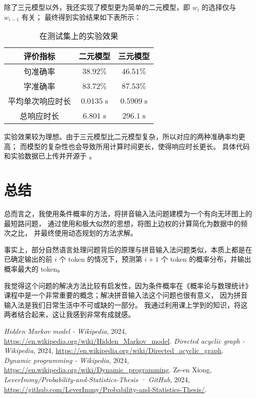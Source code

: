 \documentclass[UTF8]{ctexart}
\begin{document}
除了三元模型以外，我还实现了模型更为简单的二元模型，即 $w_i$ 的选择仅与 $w_{i-1}$ 有关；
最终得到实验结果如下表所示：
\begin{table}[H]
    \centering
    \begin{tabular}{||c||c|c||}
        \hline
        评价指标 & 二元模型 & 三元模型 \\
        \hline
        句准确率 & $38.92\%$ & $46.51\%$ \\
        字准确率 & $83.72\%$ & $87.53\%$ \\
        平均单次响应时长 & $0.0135\;\mathrm{s}$ & $0.5909\;\mathrm{s}$ \\
        总响应时长 & $6.801\;\mathrm{s}$ & $296.1\;\mathrm{s}$ \\
        \hline
    \end{tabular}
    \caption{在测试集上的实验效果}
\end{table}
实验效果较为理想。由于三元模型比二元模型复杂，所以对应的两种准确率均更高；
而模型的复杂性也会导致所用计算时间更长，使得响应时长更长。
具体代码和实验数据已上传并开源于 \cite{Pinyin}。

\section{总结}

总而言之，我使用条件概率的方法，将拼音输入法问题建模为一个有向无环图上的最短路问题，
通过使用和极大似然的思想，将图上边权的计算简化为数据中的频次之比，
并最终使用动态规划的方法求解。

事实上，部分自然语言处理问题背后的原理与拼音输入法问题类似，本质上都是在已确定输出的前 $i$ 个 token
的情况下，预测第 $i+1$ 个 token 的概率分布，并输出概率最大的 token。

我觉得这个问题的解决方法比较有启发性，因为条件概率在《概率论与数理统计》
课程中是一个非常重要的概念；解决拼音输入法这个问题也很有意义，
因为拼音输入法是我们日常生活中不可或缺的一部分。
我通过利用课上学到的知识，将这两者结合起来，这让我感到非常有成就感。

\begin{thebibliography}{9}
    \emph{Hidden Markov model - Wikipedia},
    2024,
    \url{https://en.wikipedia.org/wiki/Hidden_Markov_model}.
    \emph{Directed acyclic graph - Wikipedia},
    2024,
    \url{https://en.wikipedia.org/wiki/Directed_acyclic_graph}.
    \emph{Dynamic programming - Wikipedia},
    2024,
    \url{https://en.wikipedia.org/wiki/Dynamic_programming}.
    Ze-en Xiong,
    \emph{LeverImmy/Probability-and-Statistics-Thesis · GitHub},
    2024,
    \url{https://github.com/LeverImmy/Probability-and-Statistics-Thesis/}.
\end{thebibliography}
\end{document}
